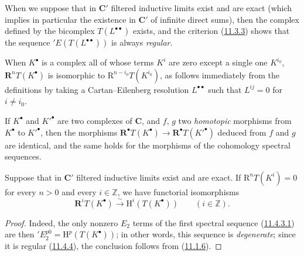 \begin{env}[11.4.3]
When we suppose that in $\boldsymbol{C}'$ filtered inductive limits
exist and are exact (which implies in particular the existence in
$\boldsymbol{C}'$ of infinite direct sums), then the complex defined by the
bicomplex $T(L^{\bullet\bullet})$ exists, and the criterion
(\hyperref[0.11.3.3]{11.3.3}) shows that the sequence
$'E(T(L^{\bullet\bullet}))$ is always \emph{regular}.

When $K^\bullet$ is a complex all of whose terms $K^i$ are zero except
a single one $K^{i_0}$, $\mathbf R^nT(K^\bullet)$ is isomorphic to
$\mathrm R^{n-i_0}T(K^{i_0})$, as follows immediately from the definitions by
taking a Cartan--Eilenberg resolution $L^{\bullet\bullet}$ such that
$L^{ij}=0$ for $i\neq i_0$.

If $K^\bullet$ and $K'^\bullet$ are two complexes of $\boldsymbol{C}$, and $f$, $g$
two \emph{homotopic} morphisms from $K^\bullet$ to $K'^\bullet$, then the
morphisms $\mathbf R^\bullet T(K^\bullet)\to
\mathbf R^\bullet T(K'^\bullet)$ deduced from $f$ and $g$ are identical, and the
same holds for the morphisms of the cohomology spectral sequences.
\end{env}

\begin{proposition}[11.4.5]
\label{0.11.4.5}
Suppose that in $\boldsymbol{C}'$ filtered inductive limits exist and
are exact. If $\mathrm R^nT(K^i)=0$ for every $n>0$ and every
$i\in\mathbb Z$, we have functorial isomorphisms
\[
  \label{0.11.4.5.1}
  \mathbf R^iT(K^\bullet)\xrightarrow{\sim}
  \mathrm H^i(T(K^\bullet))\qquad(i\in\mathbb Z).
  \tag{11.4.5.1}
\]
\end{proposition}

\begin{proof}
Indeed, the only nonzero $E_2$ terms of the first spectral sequence
(\hyperref[0.11.4.3.1]{11.4.3.1}) are then
$'E_2^{p0}=\mathrm H^p(T(K^\bullet))$; in other words, this sequence is
\emph{degenerate}; since it is regular
(\hyperref[0.11.4.4]{11.4.4}), the conclusion follows from
(\hyperref[0.11.1.6]{11.1.6}).
\end{proof}

